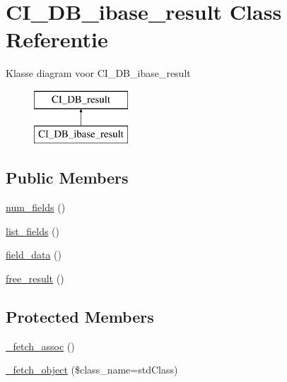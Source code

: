 \hypertarget{class_c_i___d_b__ibase__result}{}\section{C\+I\+\_\+\+D\+B\+\_\+ibase\+\_\+result Class Referentie}
\label{class_c_i___d_b__ibase__result}
Klasse diagram voor C\+I\+\_\+\+D\+B\+\_\+ibase\+\_\+result\begin{figure}[H]
\begin{center}
\leavevmode
\includegraphics[height=2.000000cm]{class_c_i___d_b__ibase__result}
\end{center}
\end{figure}
\subsection*{Public Members}
\begin{DoxyCompactItemize}
\item 
\mbox{\hyperlink{class_c_i___d_b__ibase__result_af831bf363e4d7d661a717a4932af449d}{num\+\_\+fields}} ()
\item 
\mbox{\hyperlink{class_c_i___d_b__ibase__result_a50b54eb4ea7cfd039740f532988ea776}{list\+\_\+fields}} ()
\item 
\mbox{\hyperlink{class_c_i___d_b__ibase__result_a84bffd65e53902ade1591716749a33e3}{field\+\_\+data}} ()
\item 
\mbox{\hyperlink{class_c_i___d_b__ibase__result_aad2d98d6beb3d6095405356c6107b473}{free\+\_\+result}} ()
\end{DoxyCompactItemize}
\subsection*{Protected Members}
\begin{DoxyCompactItemize}
\item 
\mbox{\hyperlink{class_c_i___d_b__ibase__result_a43a9a92817f1334a1c10752ec44275a0}{\+\_\+fetch\+\_\+assoc}} ()
\item 
\mbox{\hyperlink{class_c_i___d_b__ibase__result_a60806be6a9c2488820813c2a7f4fef71}{\+\_\+fetch\+\_\+object}} (\$class\+\_\+name=\textquotesingle{}std\+Class\textquotesingle{})
\end{DoxyCompactItemize}
